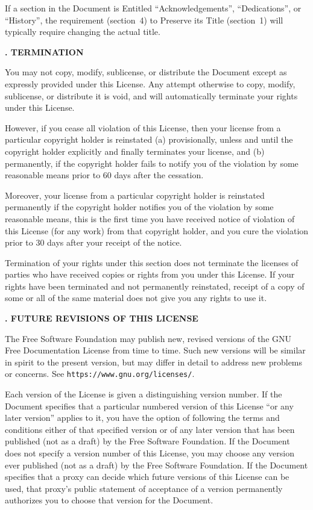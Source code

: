 If a section in the Document is Entitled ``Acknowledgements'',
``Dedications'', or ``History'', the requirement (section~4) to Preserve
its Title (section~1) will typically require changing the actual
title.


\begin{flushleft}
    {\large\bfseries{}. TERMINATION\par}
\end{flushleft}


You may not copy, modify, sublicense, or distribute the Document
except as expressly provided under this License.  Any attempt
otherwise to copy, modify, sublicense, or distribute it is void, and
will automatically terminate your rights under this License.

However, if you cease all violation of this License, then your license
from a particular copyright holder is reinstated (a) provisionally,
unless and until the copyright holder explicitly and finally
terminates your license, and (b) permanently, if the copyright holder
fails to notify you of the violation by some reasonable means prior to
60 days after the cessation.

Moreover, your license from a particular copyright holder is
reinstated permanently if the copyright holder notifies you of the
violation by some reasonable means, this is the first time you have
received notice of violation of this License (for any work) from that
copyright holder, and you cure the violation prior to 30 days after
your receipt of the notice.

Termination of your rights under this section does not terminate the
licenses of parties who have received copies or rights from you under
this License.  If your rights have been terminated and not permanently
reinstated, receipt of a copy of some or all of the same material does
not give you any rights to use it.


\begin{flushleft}
    {\large\bfseries{}. FUTURE REVISIONS OF THIS LICENSE\par}
\end{flushleft}


The Free Software Foundation may publish new, revised versions
of the GNU Free Documentation License from time to time.  Such new
versions will be similar in spirit to the present version, but may
differ in detail to address new problems or concerns.  See
\texttt{https://www.gnu.org/licenses/}.

Each version of the License is given a distinguishing version number.
If the Document specifies that a particular numbered version of this
License ``or any later version'' applies to it, you have the option of
following the terms and conditions either of that specified version or
of any later version that has been published (not as a draft) by the
Free Software Foundation.  If the Document does not specify a version
number of this License, you may choose any version ever published (not
as a draft) by the Free Software Foundation.  If the Document
specifies that a proxy can decide which future versions of this
License can be used, that proxy's public statement of acceptance of a
version permanently authorizes you to choose that version for the
Document.


